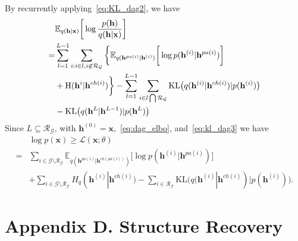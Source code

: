 \documentclass[conference]{IEEEtran}
\begin{document}
By recurrently applying~\eqref{eq:KL_dag2}, we have 
\begin{align} \label{eq:kl_dag3}
& \mathbb{E}_{q(\mathbf{h} | \mathbf{x})} \bigg[ \log  \frac{p( \mathbf{h})}{q(\mathbf{h}|\mathbf{x})}  \bigg] \\ \notag
=& \sum_{l=1}^{L-1}   \sum_{i:i\in l, i \not\in   \mathcal{R}_{ \mathcal{G}}  }  \bigg\{ \mathbb{E}_{q(\mathbf{h}^{pa(i)}|\mathbf{h}^{(i)})} \bigg[ \log p( \mathbf{h}^{(i)}|  \mathbf{h}^{pa(i)})   \bigg] \\
& +    \text{H}(\mathbf{h}^i | \mathbf{h}^{ch(i)} )  \bigg\} \notag
 -   \sum_{l=1}^{L-1}  \sum_{i \in l \bigcap \mathcal{R}_{ \mathcal{G} }  }  \text{KL}\big(q(\mathbf{h}^{(i)} | \mathbf{h}^{ch(i)} )   | p(\mathbf{h}^{(i)})  \big) \\
 & -   \text{KL}\big(q(\mathbf{h}^L | \mathbf{h}^{L-1} )   | p(\mathbf{h}^L)  \big)   
 \end{align}
Since $L  \subseteq   \mathcal{R}_{ \mathcal{G}} $,  with $\mathbf{h}^{(0)} = \mathbf{x}$,~\eqref{eq:dag_elbo}, and~\eqref{eq:kl_dag3} we have 
\begin{align*}  
& \log p(\mathbf{x}) \geqslant \mathcal{L}(\mathbf{x}; \theta) \\
=&   \sum_{i \in \mathcal{G}  \setminus  \mathcal{R}_{ \mathcal{G} }  }  \mathbb{E}_{q(\mathbf{h}^{pa(i)}|\mathbf{h}^{ch(pa(i))})} \bigg[ \log p( \mathbf{h}^{(i)}|  \mathbf{h}^{pa(i)})   \bigg]  \\
 & +  \sum_{i \in \mathcal{G}  \setminus  \mathcal{R}_{ \mathcal{G} }  } H_q(\mathbf{h}^{(i)} | \mathbf{h}^{ch(i)} )   -    \sum_{i \in  \mathcal{R}_{ \mathcal{G} }  }  \text{KL}\big(q(\mathbf{h}^{(i)} | \mathbf{h}^{ch(i)} )   | p(\mathbf{h}^{(i)})  \big) .   
 \end{align*}

 
\section*{Appendix D.  Structure Recovery }
\end{document}
